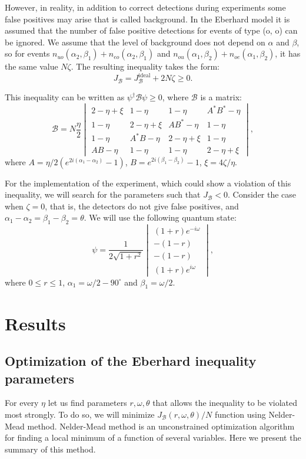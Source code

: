 \documentclass[%
master,         %
subf,           %
href,           %
colorlinks=true %
]{disser}
\numberwithin{equation}{section}
\numberwithin{figure}{section}
\begin{document}
However, in reality, in addition to correct detections during experiments some false positives may arise that is called background. In the Eberhard model it is assumed that the number of false positive detections for events of type (o, o) can be ignored. We assume that the level of background does not depend on $\alpha$ and $\beta$, so for events $n_{uo}(\alpha_2, \beta_1) + n_{eo}(\alpha_2, \beta_1)$ and $n_{ou}(\alpha_1, \beta_2) + n_{oe}(\alpha_1, \beta_2)$, it has the same value $N\zeta$. The resulting inequality takes the form:
\[
J_{\mathcal{B}} = J_{\mathcal{B}}^{\mbox{ideal}} + 2N\zeta \geq 0.
\]

This inequality can be written as $\psi^\dagger\mathcal{B}\psi \geq 0$, where $\mathcal{B}$ is a matrix:
\[
\mathcal{B} = N \dfrac{\eta}{2}
\begin{vmatrix}
2 - \eta + \xi & 1 - \eta & 1 - \eta & A^*B^* - \eta\\
1 - \eta & 2 - \eta + \xi & AB^* - \eta & 1 - \eta\\
1 - \eta & A^*B - \eta & 2 - \eta + \xi & 1 - \eta\\
AB - \eta & 1 - \eta & 1 - \eta & 2 - \eta + \xi
\end{vmatrix},
\]
where $A = \eta/2(e^{2i(\alpha_1-\alpha_2)} - 1)$, $B = e^{2i(\beta_1 - \beta_2)} -1$, $\xi = 4\zeta/\eta$.

For the implementation of the experiment, which could show a violation of this inequality, we will search for the parameters such that $J_{\mathcal{B}} < 0$. Consider the case when $\zeta = 0$, that is, the detectors do not give false positives, and $\alpha_1 - \alpha_2 = \beta_1 - \beta_2 = \theta$. We will use the following quantum state:
\[
\psi = \frac{1}{2\sqrt{1 + r^2}}
\begin{vmatrix}
(1+r)e^{-i\omega}\\
-(1 - r)\\
-(1 - r)\\
(1 + r)e^{i\omega}
\end{vmatrix},
\]
where $0 \leq r \leq 1$, $\alpha_1 = \omega / 2 - 90^\circ$ and $\beta_1 = \omega / 2$.

\section{Results}
\subsection{Optimization of the Eberhard inequality parameters }
For every $\eta$ let us find parameters $r, \omega, \theta$ that allows the inequality to be violated most strongly.
To do so, we will minimize $J_{\mathcal{B}}(r, \omega, \theta) / N$ function using Nelder-Mead method. Nelder-Mead method is an unconstrained optimization algorithm for finding a local minimum of a function of several variables. Here we present the summary of this method.
\end{document}
